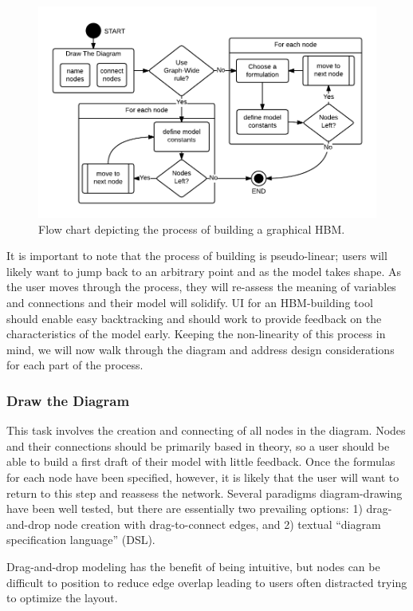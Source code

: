 \documentclass[runningheads,a4paper]{llncs}
\begin{document}
\begin{figure}[!t]
  \centering
  \includegraphics[width=0.9\columnwidth]{img/HBM-build-process}
  \caption{Flow chart depicting the process of building a graphical HBM.}
  \label{HBM-build-process}
\end{figure}

It is important to note that the process of building is pseudo-linear; users will likely want to jump back to an arbitrary point and as the model takes shape. 
As the user moves through the process, they will re-assess the meaning of variables and connections and their model will solidify. 
UI for an HBM-building tool should enable easy backtracking and should work to provide feedback on the characteristics of the model early. 
Keeping the non-linearity of this process in mind, we will now walk through the diagram and address design considerations for each part of the process.

\subsubsection{Draw the Diagram}
This task involves the creation and connecting of all nodes in the diagram. 
Nodes and their connections should be primarily based in theory, so a user should be able to build a first draft of their model with little feedback. 
Once the formulas for each node have been specified, however, it is likely that the user will want to return to this step and reassess the network. 
Several paradigms diagram-drawing have been well tested, but there are essentially two prevailing options:
1) drag-and-drop node creation with drag-to-connect edges, and 2) textual ``diagram specification language'' (DSL).

Drag-and-drop modeling has the benefit of being intuitive, but nodes can be difficult to position to reduce edge overlap leading to users often distracted trying to optimize the layout.
\end{document}
